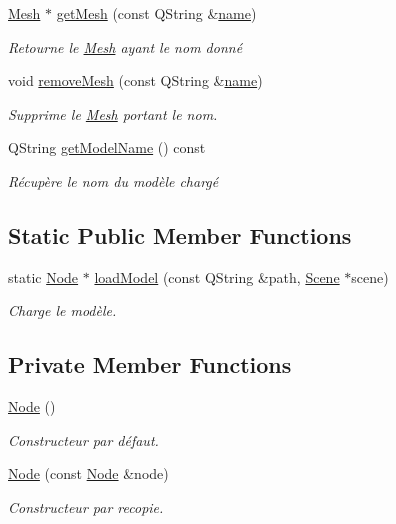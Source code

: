 \begin{DoxyCompactItemize}
\hyperlink{class_mesh}{Mesh} $\ast$ \hyperlink{class_node_a47c225bb649c6d44763661f6e3253c7c}{get\+Mesh} (const Q\+String \&\hyperlink{class_objet_a4a702c189bedcbf1e65da6aec72c8e44}{name})
\begin{DoxyCompactList}\small\item\em Retourne le \hyperlink{class_mesh}{Mesh} ayant le nom donné \end{DoxyCompactList}\item 
void \hyperlink{class_node_ada41b9bdf6e91579ef585e1272f66045}{remove\+Mesh} (const Q\+String \&\hyperlink{class_objet_a4a702c189bedcbf1e65da6aec72c8e44}{name})
\begin{DoxyCompactList}\small\item\em Supprime le \hyperlink{class_mesh}{Mesh} portant le nom. \end{DoxyCompactList}\item 
Q\+String \hyperlink{class_node_adf80c463ba15d60645252ffa171fd209}{get\+Model\+Name} () const 
\begin{DoxyCompactList}\small\item\em Récupère le nom du modèle chargé \end{DoxyCompactList}\end{DoxyCompactItemize}
\subsection*{Static Public Member Functions}
\begin{DoxyCompactItemize}
\item 
static \hyperlink{class_node}{Node} $\ast$ \hyperlink{class_node_ac2140ddf8f06f8b5620e6743c945c482}{load\+Model} (const Q\+String \&path, \hyperlink{class_scene}{Scene} $\ast$scene)
\begin{DoxyCompactList}\small\item\em Charge le modèle. \end{DoxyCompactList}\end{DoxyCompactItemize}
\subsection*{Private Member Functions}
\begin{DoxyCompactItemize}
\item 
\hyperlink{class_node_ad7a34779cad45d997bfd6d3d8043c75f}{Node} ()
\begin{DoxyCompactList}\small\item\em Constructeur par défaut. \end{DoxyCompactList}\item 
\hyperlink{class_node_a4bf5930c1238505203c3dcf6e4573bad}{Node} (const \hyperlink{class_node}{Node} \&node)
\begin{DoxyCompactList}\small\item\em Constructeur par recopie. \end{DoxyCompactList}\end{DoxyCompactItemize}
